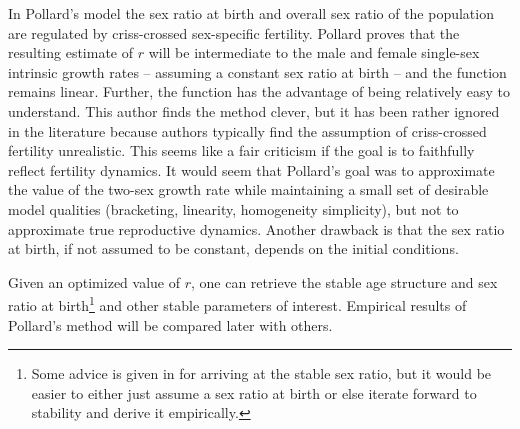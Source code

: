 In Pollard's model the sex ratio at birth and overall sex ratio
of the population are regulated by criss-crossed sex-specific fertility. Pollard
proves that the resulting estimate of $r$ will be intermediate to the male and female
single-sex intrinsic growth rates -- assuming a constant sex ratio at birth --
and the function remains linear. Further, the function has the advantage of being 
relatively easy to understand.
This author finds the method clever, but it has been rather ignored in the
literature because authors typically find the assumption of criss-crossed
fertility unrealistic. This seems like a fair criticism if the goal is to
faithfully reflect fertility dynamics. It would seem that Pollard's goal 
was to approximate the value of the two-sex growth rate while maintaining
a small set of desirable model qualities (bracketing, linearity, homogeneity
simplicity), but not to approximate true reproductive dynamics. Another drawback
is that the sex ratio at birth, if not assumed to be constant, depends on the
initial conditions. 

Given an optimized value of $r$, one can retrieve the stable age structure and
sex ratio at birth\footnote{Some advice is given in
\citet{pollard1948measurement} for arriving at the stable sex ratio, but it
would be easier to either just assume a sex ratio at birth or else iterate
forward to stability and derive it empirically.} and other stable parameters of
interest. Empirical results of Pollard's method will be compared later with
others.
